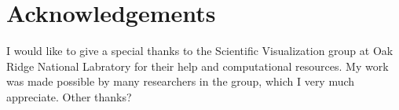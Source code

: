 \documentclass{IEEEtran}
\begin{document}
\section{Acknowledgements}
I would like to give a special thanks to the Scientific Visualization group at Oak Ridge National Labratory for their help and computational resources.
%
My work was made possible by many researchers in the group, which I very much appreciate.
%
Other thanks?

 

\end{document}
